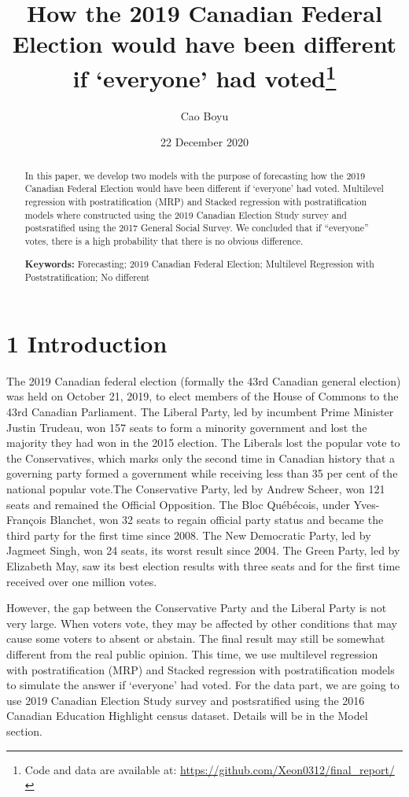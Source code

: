 \documentclass[
  12pt,
]{article}
\title{How the 2019 Canadian Federal Election would have been different if
`everyone' had voted\thanks{Code and data are available at:
\url{https://github.com/Xeon0312/final_report/}}}
\author{Cao Boyu}
\date{22 December 2020}
\begin{document}
\maketitle
\begin{abstract}
In this paper, we develop two models with the purpose of forecasting how
the 2019 Canadian Federal Election would have been different if
`everyone' had voted. Multilevel regression with postratification (MRP)
and Stacked regression with postratification models where constructed
using the 2019 Canadian Election Study survey and postsratified using
the 2017 General Social Survey. We concluded that if ``everyone'' votes,
there is a high probability that there is no obvious difference.

\textbf{Keywords:} Forecasting; 2019 Canadian Federal Election;
Multilevel Regression with Poststratification; No different
\end{abstract}

\hypertarget{introduction}{%
\section{1 Introduction}\label{introduction}}

The 2019 Canadian federal election (formally the 43rd Canadian general
election) was held on October 21, 2019, to elect members of the House of
Commons to the 43rd Canadian Parliament. The Liberal Party, led by
incumbent Prime Minister Justin Trudeau, won 157 seats to form a
minority government and lost the majority they had won in the 2015
election. The Liberals lost the popular vote to the Conservatives, which
marks only the second time in Canadian history that a governing party
formed a government while receiving less than 35 per cent of the
national popular vote.The Conservative Party, led by Andrew Scheer, won
121 seats and remained the Official Opposition. The Bloc Québécois,
under Yves-François Blanchet, won 32 seats to regain official party
status and became the third party for the first time since 2008. The New
Democratic Party, led by Jagmeet Singh, won 24 seats, its worst result
since 2004. The Green Party, led by Elizabeth May, saw its best election
results with three seats and for the first time received over one
million votes.

However, the gap between the Conservative Party and the Liberal Party is
not very large. When voters vote, they may be affected by other
conditions that may cause some voters to absent or abstain. The final
result may still be somewhat different from the real public opinion.
This time, we use multilevel regression with postratification (MRP) and
Stacked regression with postratification models to simulate the answer
if `everyone' had voted. For the data part, we are going to use 2019
Canadian Election Study survey and postsratified using the 2016 Canadian
Education Highlight census dataset. Details will be in the Model
section.
\end{document}
